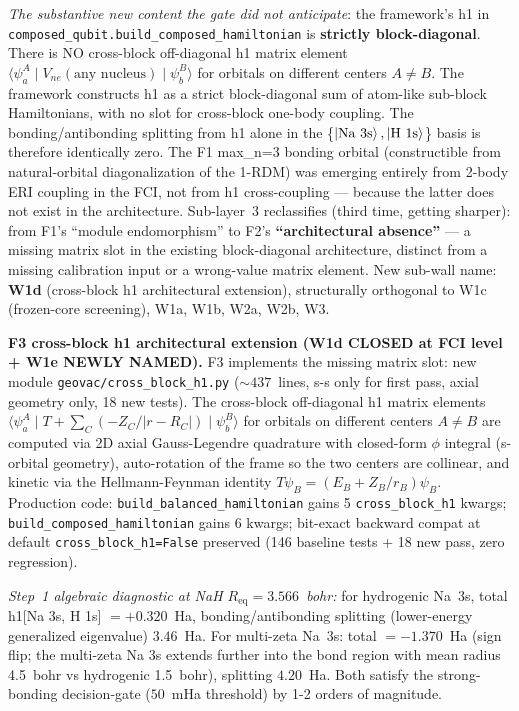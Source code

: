 \documentclass[aps,pra,twocolumn,superscriptaddress,longbibliography]{revtex4-2}
\begin{document}
\emph{The substantive new content the gate did not anticipate}: the
framework's h1 in \texttt{composed\_qubit.build\_composed\_hamiltonian} is
\textbf{strictly block-diagonal}. There is NO cross-block off-diagonal h1
matrix element $\langle\psi_a^A \mid V_{ne}(\text{any nucleus}) \mid
\psi_b^B\rangle$ for orbitals on different centers $A \neq B$. The
framework constructs h1 as a strict block-diagonal sum of atom-like
sub-block Hamiltonians, with no slot for cross-block one-body coupling.
The bonding/antibonding splitting from h1 alone in the
\{$\ket{\text{Na 3s}}, \ket{\text{H 1s}}$\} basis is therefore identically
zero. The F1 max\_n=3 bonding orbital (constructible from natural-orbital
diagonalization of the 1-RDM) was emerging entirely from 2-body ERI
coupling in the FCI, not from h1 cross-coupling --- because the latter
does not exist in the architecture. Sub-layer~3 reclassifies (third time,
getting sharper): from F1's ``module endomorphism'' to F2's
\textbf{``architectural absence''} --- a missing matrix slot in the
existing block-diagonal architecture, distinct from a missing calibration
input or a wrong-value matrix element. New sub-wall name: \textbf{W1d}
(cross-block h1 architectural extension), structurally orthogonal to W1c
(frozen-core screening), W1a, W1b, W2a, W2b, W3.

\textbf{F3 cross-block h1 architectural extension (W1d CLOSED at FCI level
+ W1e NEWLY NAMED).} F3 implements the missing matrix slot: new module
\texttt{geovac/cross\_block\_h1.py} ($\sim 437$~lines, s-s only for first
pass, axial geometry only, 18 new tests). The cross-block off-diagonal
h1 matrix elements
$\langle\psi_a^A \mid T + \sum_C (-Z_C/|r-R_C|) \mid \psi_b^B\rangle$
for orbitals on different centers $A \neq B$ are computed via 2D axial
Gauss-Legendre quadrature with closed-form $\phi$ integral (s-orbital
geometry), auto-rotation of the frame so the two centers are collinear,
and kinetic via the Hellmann-Feynman identity
$T\psi_B = (E_B + Z_B/r_B)\psi_B$. Production code: \texttt{build\_balanced\_hamiltonian}
gains 5 \texttt{cross\_block\_h1} kwargs; \texttt{build\_composed\_hamiltonian}
gains 6 kwargs; bit-exact backward compat at default \texttt{cross\_block\_h1=False}
preserved (146 baseline tests + 18 new pass, zero regression).

\emph{Step~1 algebraic diagnostic at NaH $R_\text{eq}=3.566$~bohr:} for
hydrogenic Na~3s, total h1[Na 3s, H 1s] $= +0.320$~Ha, bonding/antibonding
splitting (lower-energy generalized eigenvalue) $3.46$~Ha. For multi-zeta
Na~3s: total $= -1.370$~Ha (sign flip; the multi-zeta Na 3s extends further
into the bond region with mean radius 4.5~bohr vs hydrogenic 1.5~bohr),
splitting $4.20$~Ha. Both satisfy the strong-bonding decision-gate
($50$~mHa threshold) by 1-2 orders of magnitude.
\end{document}
